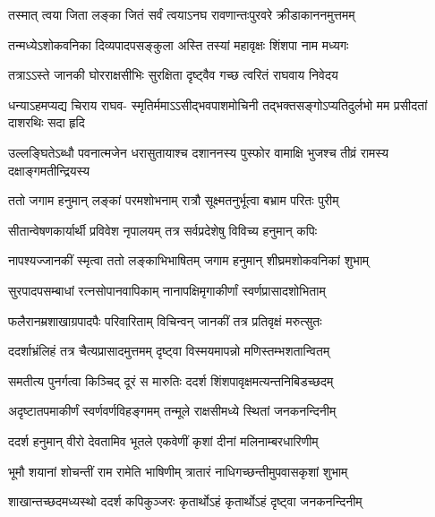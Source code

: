 \twolineshloka
{तस्मात् त्वया जिता लङ्का जितं सर्वं त्वयाऽनघ}
{रावणान्तःपुरवरे क्रीडाकाननमुत्तमम्} %

\twolineshloka
{तन्मध्येऽशोकवनिका दिव्यपादपसङ्कुला}
{अस्ति तस्यां महावृक्षः शिंशपा नाम मध्यगः} %

\twolineshloka
{तत्राऽऽस्ते जानकी घोरराक्षसीभिः सुरक्षिता}
{दृष्ट्वैव गच्छ त्वरितं राघवाय निवेदय} %

\fourlineindentedshloka
{धन्याऽहमप्यद्य चिराय राघव-}
{स्मृतिर्ममाऽऽसीद्भवपाशमोचिनी}
{तद्भक्तसङ्गोऽप्यतिदुर्लभो मम}
{प्रसीदतां दाशरथिः सदा हृदि} %

\fourlineindentedshloka
{उल्लङ्घितेऽब्धौ पवनात्मजेन}
{धरासुतायाश्च दशाननस्य}
{पुस्फोर वामाक्षि भुजश्च तीव्रं}
{रामस्य दक्षाङ्गमतीन्द्रियस्य} %






\twolineshloka
{ततो जगाम हनुमान् लङ्कां परमशोभनाम्}
{रात्रौ सूक्ष्मतनुर्भूत्वा बभ्राम परितः पुरीम्} %

\twolineshloka
{सीतान्वेषणकार्यार्थी प्रविवेश नृपालयम्}
{तत्र सर्वप्रदेशेषु विविच्य हनुमान् कपिः} %

\twolineshloka
{नापश्यज्जानकीं स्मृत्वा ततो लङ्काभिभाषितम्}
{जगाम हनुमान् शीघ्रमशोकवनिकां शुभाम्} %

\twolineshloka
{सुरपादपसम्बाधां रत्नसोपानवापिकाम्}
{नानापक्षिमृगाकीर्णां स्वर्णप्रासादशोभिताम्} %

\twolineshloka
{फलैरानम्रशाखाग्रपादपैः परिवारिताम्}
{विचिन्वन् जानकीं तत्र प्रतिवृक्षं मरुत्सुतः} %

\twolineshloka
{ददर्शाभ्रंलिहं तत्र चैत्यप्रासादमुत्तमम्}
{दृष्ट्वा विस्मयमापन्नो मणिस्तम्भशतान्वितम्} %

\twolineshloka
{समतीत्य पुनर्गत्वा किञ्चिद् दूरं स मारुतिः}
{ददर्श शिंशपावृक्षमत्यन्तनिबिडच्छदम्} %

\twolineshloka
{अदृष्टातपमाकीर्णं स्वर्णवर्णविहङ्गमम्}
{तन्मूले राक्षसीमध्ये स्थितां जनकनन्दिनीम्} %

\twolineshloka
{ददर्श हनुमान् वीरो देवतामिव भूतले}
{एकवेणीं कृशां दीनां मलिनाम्बरधारिणीम्} %

\twolineshloka
{भूमौ शयानां शोचन्तीं राम रामेति भाषिणीम्}
{त्रातारं नाधिगच्छन्तीमुपवासकृशां शुभाम्} %

\twolineshloka
{शाखान्तच्छदमध्यस्थो ददर्श कपिकुञ्जरः}
{कृतार्थोऽहं कृतार्थोऽहं दृष्ट्वा जनकनन्दिनीम्} %

